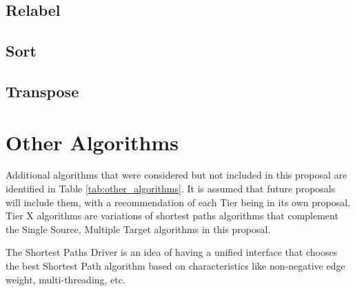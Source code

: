 \subsection{Relabel}

\subsection{Sort}

\subsection{Transpose}




\section{Other Algorithms} \label{other_algo}

Additional algorithms that were considered but not included in this proposal are identified in Table \ref{tab:other_algorithms}. 
It is assumed that future proposals will include them, with a recommendation of each Tier being in its own proposal.
Tier X algorithms are variations of shortest paths algorithms that complement the Single Source, Multiple Target algorithms 
in this proposal.

The Shortest Paths Driver is an idea of having a unified interface that chooses the best Shortest Path algorithm
based on characteristics like non-negative edge weight, multi-threading, etc.

